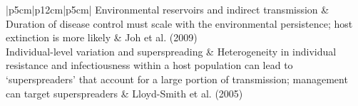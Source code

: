 \begin{table}
\begin{tabular}{{|p{5cm}|p{12cm}|p{5cm}|}}
	Environmental reservoirs and indirect transmission & Duration of disease control must scale with the environmental persistence; host extinction is more likely	& Joh et al. (2009) \\ \hline
	Individual-level variation and superspreading	& Heterogeneity in individual resistance and infectiousness within a host population can lead to ‘superspreaders’ that account for a large portion of transmission; management can target superspreaders & Lloyd-Smith et al. (2005) \\ \hline
	\end{tabular}
\label{tab1}
\end{table}
